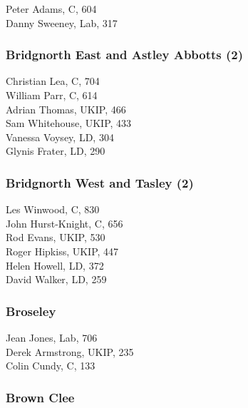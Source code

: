 \documentclass[a4paper,openany,10pt]{book}
\begin{document}
Peter Adams, C, 604\\
Danny Sweeney, Lab, 317\\


\subsubsection*{Bridgnorth East and Astley Abbotts (2)}



Christian Lea, C, 704\\
William Parr, C, 614\\
Adrian Thomas, UKIP, 466\\
Sam Whitehouse, UKIP, 433\\
Vanessa Voysey, LD, 304\\
Glynis Frater, LD, 290\\


\subsubsection*{Bridgnorth West and Tasley (2)}



Les Winwood, C, 830\\
John Hurst-Knight, C, 656\\
Rod Evans, UKIP, 530\\
Roger Hipkiss, UKIP, 447\\
Helen Howell, LD, 372\\
David Walker, LD, 259\\


\subsubsection*{Broseley}



Jean Jones, Lab, 706\\
Derek Armstrong, UKIP, 235\\
Colin Cundy, C, 133\\


\subsubsection*{Brown Clee}
\end{document}
